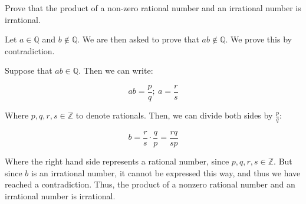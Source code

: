 \documentclass[11pt]{article}
\begin{document}
Prove that the product of a non-zero rational number and an irrational number is irrational.

\begin{solution}
    Let $a \in \mathbb Q$ and $b \notin \mathbb Q$. We are then asked to prove that $ab \notin \mathbb Q$. We prove this by contradiction.

    Suppose that $ab \in \mathbb Q$. Then we can write:

    \[ ab = \frac{p}{q}; \ a = \frac{r}{s}\]

    Where $p, q, r, s \in \mathbb Z$ to denote rationals. Then, we can divide both sides by $\frac{p}{q}$:

    \[ b = \frac{r}{s} \cdot \frac{q}{p} = \frac{rq}{sp}\] 

    Where the right hand side represents a rational number, since $p, q, r, s \in \mathbb Z$. But since $b$ is an irrational number, it cannot be expressed this way, and thus we have reached a contradiction. Thus, the product of a nonzero rational number and an irrational number is irrational.
\end{solution}

\end{document}
